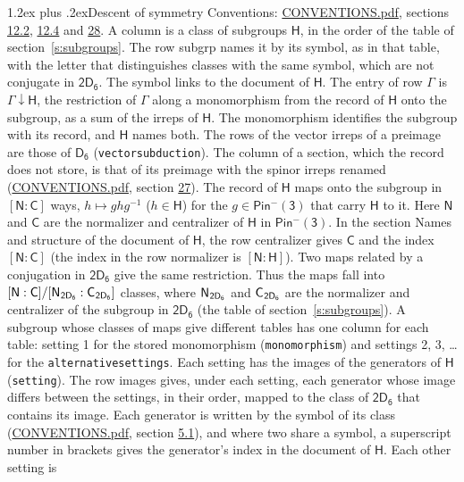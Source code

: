 \documentclass[10pt,a4paper]{article}
\makeatletter
\renewcommand\section{\@startsection{section}{1}{\z@}{-3ex plus -1ex minus -.2ex}%
  {1.2ex plus .2ex}{\normalfont\large\sffamily\bfseries\color{parttitle}}}
\numberwithin{equation}{section}
\newcommand{\grp}[1]{\mathsf{#1}}
\newcommand{\grpindex}[2]{[#1 : #2]}
\newcommand{\restr}[2]{#1\!\downarrow#2}
\newcommand{\hairsp}{\mkern1mu}
\makeatother
\begin{document}
\section{Descent of symmetry}\label{s:subduction}
Conventions: \href{../../CONVENTIONS.pdf}{CONVENTIONS.pdf}, sections \href{../../../rotation/CONVENTIONS.pdf\#conv.12.2}{12.2}, \href{../../../rotation/CONVENTIONS.pdf\#conv.12.4}{12.4} and \href{../../CONVENTIONS.pdf\#conv.28}{28}.
A column is a class of subgroups $\grp{H}$, in the order of the table of section~\ref{s:subgroups}. The row subgrp names it by its symbol, as in that table, with the letter that distinguishes classes with the same symbol, which are not conjugate in $\grp{2D_{6}}$. The symbol links to the document of $\grp{H}$. The entry of row $\Gamma$ is $\restr{\Gamma}{\grp{H}}$, the restriction of $\Gamma$ along a monomorphism from the record of $\grp{H}$ onto the subgroup, as a sum of the irreps of $\grp{H}$. The monomorphism identifies the subgroup with its record, and $\grp{H}$ names both. The rows of the vector irreps of a preimage are those of \href{../../../rotation/data/pdf/D6.pdf}{$\grp{D_{6}}$} (\texttt{vectorsubduction}). The column of a section, which the record does not store, is that of its preimage with the spinor irreps renamed (\href{../../CONVENTIONS.pdf}{CONVENTIONS.pdf}, section \href{../../CONVENTIONS.pdf\#conv.27}{27}). \label{n:group.normalizer.o3}\label{n:group.centralizer.o3}\label{n:element.h}The record of $\grp{H}$ maps onto the subgroup in $\grpindex{\grp{N}}{\grp{C}}$ ways, $h \mapsto g h g^{-1}$ ($h \in \grp{H}$) for the $g \in \grp{Pin^{-}(3)}$ that carry $\grp{H}$ to it. Here $\grp{N}$ and $\grp{C}$ are the normalizer and centralizer of $\grp{H}$ in \href{Pinminus3.pdf}{$\grp{Pin^{-}(3)}$}. In the section Names and structure of the document of $\grp{H}$, the row centralizer gives $\grp{C}$ and the index $\grpindex{\grp{N}}{\grp{C}}$ (the index in the row normalizer is $\grpindex{\grp{N}}{\grp{H}}$). Two maps related by a conjugation in $\grp{2D_{6}}$ give the same restriction. Thus the maps fall into $\grpindex{\grp{N}}{\grp{C}}/\grpindex{\grp{N}_{\hairsp \grp{2D_{6}}}}{\grp{C}_{\hairsp \grp{2D_{6}}}}$ classes, where $\grp{N}_{\hairsp \grp{2D_{6}}}$ and $\grp{C}_{\hairsp \grp{2D_{6}}}$ are the normalizer and centralizer of the subgroup in $\grp{2D_{6}}$ (the table of section~\ref{s:subgroups}). \label{n:head.setting}A subgroup whose classes of maps give different tables has one column for each table: setting 1 for the stored monomorphism (\texttt{monomorphism}) and settings 2, 3, \dots{} for the \texttt{alternativesettings}. Each setting has the images of the generators of $\grp{H}$ (\texttt{setting}). \label{n:head.images}The row images gives, under each setting, each generator whose image differs between the settings, in their order, mapped to the class of $\grp{2D_{6}}$ that contains its image. \label{n:element.generator.index}Each generator is written by the symbol of its class (\href{../../CONVENTIONS.pdf}{CONVENTIONS.pdf}, section \href{../../../rotation/CONVENTIONS.pdf\#conv.5.1}{5.1}), and where two share a symbol, a superscript number in brackets gives the generator's index in the document of $\grp{H}$. \label{n:irrep.Delta}Each other setting is 
\end{document}
